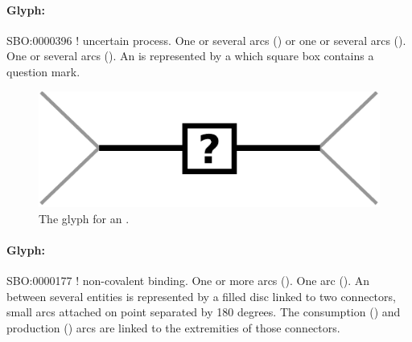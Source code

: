 
\paragraph{Glyph: }\label{sec:uncertain}

\begin{glyphDescription}
 \glyphSboTerm SBO:0000396 ! uncertain process.
 \glyphOrigin One or several  arcs () or one or several  arcs ().
 \glyphTarget One or several  arcs ().
 \glyphNode An  is represented by a  which square box contains a question mark.
 \end{glyphDescription}

\begin{figure}[H]
  \centering
  \includegraphics[scale = 0.5]{images/uncertain}
  \caption{The \PD glyph for an .}
  \label{fig:uncertain}
\end{figure}



\paragraph{Glyph: }\label{sec:association}


\begin{glyphDescription}
 \glyphSboTerm SBO:0000177 ! non-covalent binding.
 \glyphOrigin One or more  arcs ().
 \glyphTarget  One  arc ().
 \glyphNode An  between several entities is represented by a filled disc linked to two connectors, small arcs attached on point separated by 180 degrees. The consumption () and production () arcs are linked to the extremities of those connectors. 
 \end{glyphDescription}

